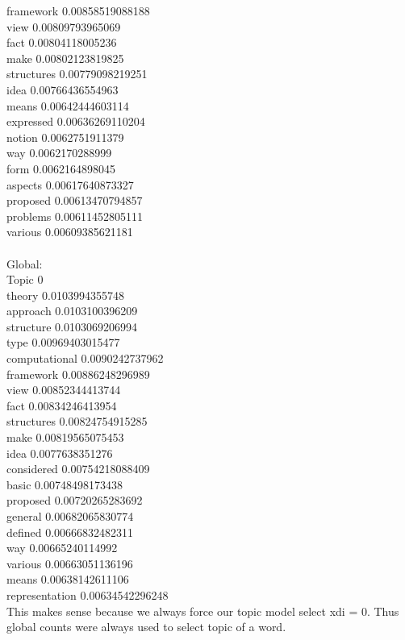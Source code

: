 \documentclass{article}
\begin{document}
framework 0.00858519088188\\
view 0.00809793965069\\
fact 0.00804118005236\\
make 0.00802123819825\\
structures 0.00779098219251\\
idea 0.00766436554963\\
means 0.00642444603114\\
expressed 0.00636269110204\\
notion 0.0062751911379\\
way 0.0062170288999\\
form 0.0062164898045\\
aspects 0.00617640873327\\
proposed 0.00613470794857\\
problems 0.00611452805111\\
various 0.00609385621181\\
\\
Global:\\
Topic 0\\
theory 0.0103994355748\\
approach 0.0103100396209\\
structure 0.0103069206994\\
type 0.00969403015477\\
computational 0.0090242737962\\
framework 0.00886248296989\\
view 0.00852344413744\\
fact 0.00834246413954\\
structures 0.00824754915285\\
make 0.00819565075453\\
idea 0.0077638351276\\
considered 0.00754218088409\\
basic 0.00748498173438\\
proposed 0.00720265283692\\
general 0.00682065830774\\
defined 0.00666832482311\\
way 0.00665240114992\\
various 0.00663051136196\\
means 0.00638142611106\\
representation 0.00634542296248\\

This makes sense because we always force our topic model select xdi = 0. Thus global counts were always used to select topic of a word.
\end{document}
